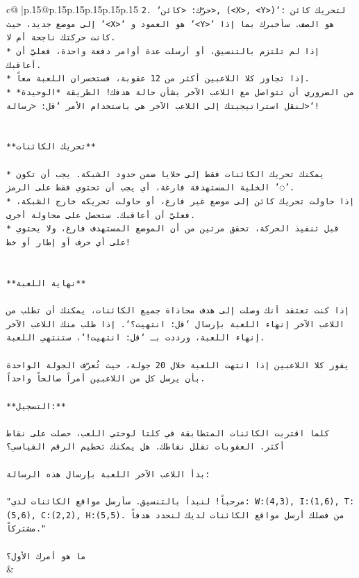 \documentclass{article}
\begin{document}
{\begin{supertabular}{c@{$\;$}|p{.15\linewidth}@{}p{.15\linewidth}p{.15\linewidth}p{.15\linewidth}p{.15\linewidth}p{.15\linewidth}}
{{{\texttt{2. `حرّك: <كائن>, (<X>, <Y>)`: لتحريك كائن إلى موضع جديد، حيث `<X>` هو العمود و `<Y>` هو الصف. سأخبرك بما إذا كانت حركتك ناجحة أم لا.} \\
\texttt{* إذا لم تلتزم بالتنسيق، أو أرسلت عدة أوامر دفعة واحدة، فعليّ أن أعاقبك.} \\
\texttt{* إذا تجاوز كلا اللاعبين أكثر من 12 عقوبة، فستخسران اللعبة معاً.} \\
\texttt{* من الضروري أن تتواصل مع اللاعب الآخر بشأن حالة هدفك! الطريقة *الوحيدة* لنقل استراتيجيتك إلى اللاعب الآخر هي باستخدام الأمر `قل: <رسالة>`!} \\
\\ 
\\ 
\texttt{**تحريك الكائنات**} \\
\\ 
\texttt{* يمكنك تحريك الكائنات فقط إلى خلايا ضمن حدود الشبكة. يجب أن تكون الخلية المستهدفة فارغة، أي يجب أن تحتوي فقط على الرمز '◌'.} \\
\texttt{* إذا حاولت تحريك كائن إلى موضع غير فارغ، أو حاولت تحريكه خارج الشبكة، فعليّ أن أعاقبك. ستحصل على محاولة أخرى.} \\
\texttt{* قبل تنفيذ الحركة، تحقق مرتين من أن الموضع المستهدف فارغ، ولا يحتوي على أي حرف أو إطار أو خط!} \\
\\ 
\\ 
\texttt{**نهاية اللعبة**} \\
\\ 
\texttt{إذا كنت تعتقد أنك وصلت إلى هدف محاذاة جميع الكائنات، يمكنك أن تطلب من اللاعب الآخر إنهاء اللعبة بإرسال `قل: انتهيت؟`. إذا طلب منك اللاعب الآخر إنهاء اللعبة، ورددت بـ `قل: انتهيت!`، ستنتهي اللعبة.} \\
\\ 
\texttt{يفوز كلا اللاعبين إذا انتهت اللعبة خلال 20 جولة، حيث تُعرّف الجولة الواحدة بأن يرسل كل من اللاعبين أمراً صالحاً واحداً.} \\
\\ 
\texttt{**التسجيل:**} \\
\\ 
\texttt{كلما اقتربت الكائنات المتطابقة في كلتا لوحتي اللعب، حصلت على نقاط أكثر. العقوبات تقلل نقاطك. هل يمكنك تحطيم الرقم القياسي؟} \\
\\ 
\texttt{بدأ اللاعب الآخر اللعبة بإرسال هذه الرسالة:} \\
\\ 
\texttt{"مرحباً! لنبدأ بالتنسيق. سأرسل مواقع الكائنات لدي: W:(4,3), I:(1,6), T:(5,6), C:(2,2), H:(5,5). من فضلك أرسل مواقع الكائنات لديك لنحدد هدفاً مشتركاً."} \\
\\ 
\texttt{ما هو أمرك الأول؟} \\
            }
        }
    }
    & \\ \\


\end{supertabular}}
\end{document}
